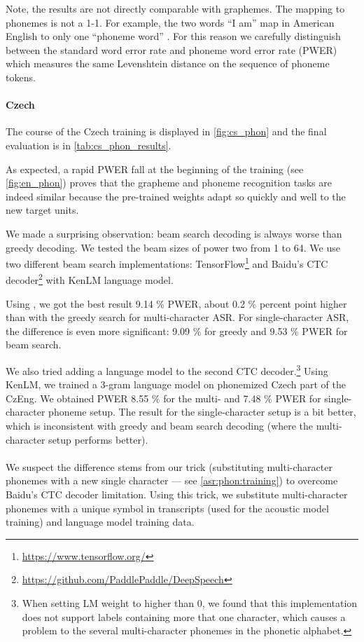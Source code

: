 Note, the results are not directly comparable with graphemes. The mapping to phonemes is not a 1-1. For example, the two words ``I am'' map in American English to only one ``phoneme word'' \textipa{[aI\ae m]}. For this reason we carefully distinguish between the standard word error rate and phoneme word error rate (PWER) which measures the same Levenshtein distance on the sequence of phoneme tokens.

\paragraph{Czech}
The course of the Czech training is displayed in \cref{fig:cs_phon} and the final evaluation is in \cref{tab:cs_phon_results}. 

As expected, a rapid PWER fall at the beginning of the training (see \cref{fig:en_phon}) proves that the grapheme and phoneme recognition tasks are indeed similar because the pre-trained weights adapt so quickly and well to the new target units.

We made a surprising observation: beam search decoding is always worse than greedy decoding. We tested the beam sizes of power two from 1 to 64. We use two different beam search implementations: TensorFlow\footnote{\url{https://www.tensorflow.org/}}  and Baidu's CTC decoder\footnote{\url{https://github.com/PaddlePaddle/DeepSpeech}} with KenLM \citep{Heafield-kenlm} language model. 

Using , we got the best result 9.14 \% PWER, about 0.2 \% percent point higher than with the greedy search for multi-character ASR. For single-character ASR, the difference is even more significant: 9.09 \% for greedy and 9.53 \% PWER for beam search. 

We also tried adding a language model to the second CTC decoder.\footnote{When setting LM weight to higher than 0, we found that this implementation does not support labels containing more that one character, which causes a problem to the several multi-character phonemes in the phonetic alphabet.} Using KenLM, we trained a 3-gram language model on phonemized Czech part of the CzEng. We obtained PWER 8.55 \% for the multi- and 7.48 \% PWER for single-character phoneme setup. The result for the single-character setup is a bit better, which is inconsistent with greedy and beam search decoding (where the multi-character setup performs better). 

\paragraph{}
We suspect the difference stems from our trick (substituting multi-character phonemes with a new single character --- see \cref{asr:phon:training}) to overcome Baidu's CTC decoder limitation. Using this trick, we substitute multi-character phonemes with a unique symbol in transcripts (used for the acoustic model training) and language model training data.

